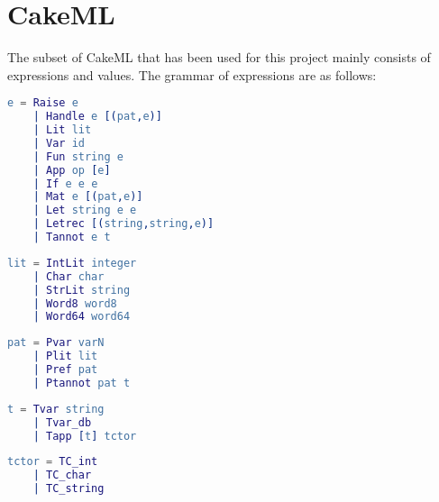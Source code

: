\section{CakeML}

The subset of CakeML that has been used for this project mainly
consists of expressions and values.
The grammar of expressions are as follows:
\\
\begin{lstlisting}[language=erlang]
  e = Raise e
    | Handle e [(pat,e)]
    | Lit lit
    | Var id
    | Fun string e
    | App op [e]
    | If e e e
    | Mat e [(pat,e)]
    | Let string e e
    | Letrec [(string,string,e)]
    | Tannot e t
\end{lstlisting}

\begin{lstlisting}[language=erlang]
  lit = IntLit integer
    | Char char
    | StrLit string
    | Word8 word8
    | Word64 word64
\end{lstlisting}

\begin{lstlisting}[language=erlang]
  pat = Pvar varN
    | Plit lit
    | Pref pat
    | Ptannot pat t
\end{lstlisting}

\begin{lstlisting}[language=erlang]
  t = Tvar string
    | Tvar_db
    | Tapp [t] tctor
\end{lstlisting}

\begin{lstlisting}[language=erlang]
  tctor = TC_int
    | TC_char
    | TC_string
\end{lstlisting}
